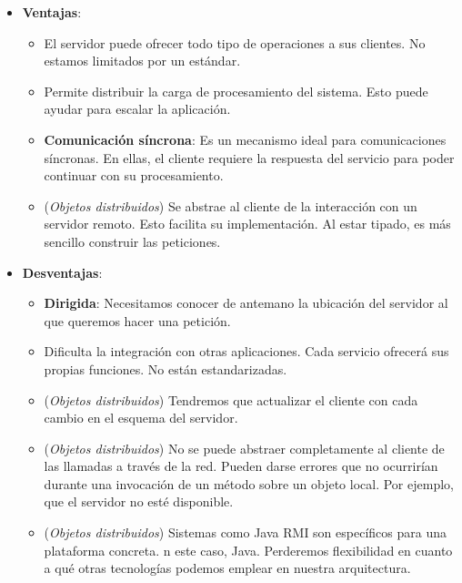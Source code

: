 \begin{itemize}
  \item \textbf{Ventajas}:
  \begin{itemize}
    \item El servidor puede ofrecer todo tipo de operaciones a sus clientes. No estamos limitados por un estándar.

    \item Permite distribuir la carga de procesamiento del sistema. Esto puede ayudar para escalar la aplicación.

    \item \textbf{Comunicación síncrona}: Es un mecanismo ideal para comunicaciones síncronas. En ellas, el cliente requiere la respuesta del servicio para poder continuar con su procesamiento.

    \item (\emph{Objetos distribuidos}) Se abstrae al cliente de la interacción con un servidor remoto. Esto facilita su implementación. Al estar tipado, es más sencillo construir las peticiones.

  \end{itemize}

  \item \textbf{Desventajas}:
  \begin{itemize}
    \item \textbf{Dirigida}: Necesitamos conocer de antemano la ubicación del servidor al que queremos hacer una petición.

    \item Dificulta la integración con otras aplicaciones. Cada servicio ofrecerá sus propias funciones. No están estandarizadas.

    \item (\emph{Objetos distribuidos}) Tendremos que actualizar el cliente con cada cambio en el esquema del servidor.

    \item (\emph{Objetos distribuidos}) No se puede abstraer completamente al cliente de las llamadas a través de la red. Pueden darse errores que no ocurrirían durante una invocación de un método sobre un objeto local. Por ejemplo, que el servidor no esté disponible. \cite{jausovecFallaciesDistributedSystems2020}

    \item (\emph{Objetos distribuidos}) Sistemas como Java RMI son específicos para una plataforma concreta. n este caso, Java. Perderemos flexibilidad en cuanto a qué otras tecnologías podemos emplear en nuestra arquitectura. \cite{newmanBuildingMicroservicesDesigning2021}
  \end{itemize}
\end{itemize}

